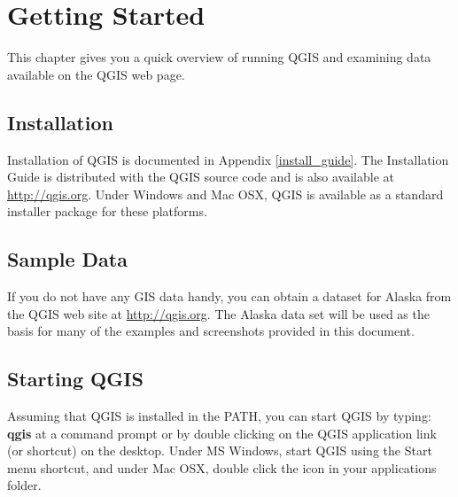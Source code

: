 \chapter{Getting Started}

This chapter gives you a quick overview of running QGIS and examining data available on the QGIS web page.


\section{Installation}
Installation of QGIS is documented in Appendix \ref{install_guide}. The Installation Guide is distributed with the QGIS source code and is also available at \url{http://qgis.org}. Under Windows and Mac OSX, QGIS is available as a standard installer package for these platforms.


\section{Sample Data}
If you do not have any GIS data handy, you can obtain a dataset for Alaska from the QGIS web site at \url{http://qgis.org}. The Alaska data set will be used as the basis for many of the examples and screenshots provided in this document.


\section{Starting QGIS}

Assuming that QGIS is installed in the PATH, you can start QGIS by
typing: \textbf{qgis}  at a command prompt or by double clicking on the QGIS application link (or shortcut) on the desktop. Under MS Windows, start QGIS using the Start menu shortcut, and under Mac OSX, double click the icon in your applications folder.
